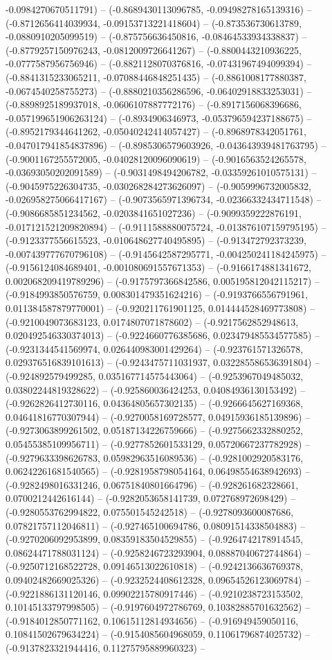 -0.0984270670511791) -- (-0.8689430113096785, -0.09498278165139316) -- (-0.8712656414039934, -0.09153713221418604) -- (-0.873536730613789, -0.0880910205099519) -- (-0.875756636450816, -0.08464533934338837) -- (-0.8779257150976243, -0.0812009726641267) -- (-0.8800443210936225, -0.0777587956756946) -- (-0.8821128070376816, -0.07431967494099394) -- (-0.8841315233065211, -0.07088446848251435) -- (-0.8861008177880387, -0.0674540258755273) -- (-0.8880210356286596, -0.06402918833253031) -- (-0.8898925189937018, -0.0606107887772176) -- (-0.8917156068396686, -0.057199651906263124) -- (-0.8934906346973, -0.053796594237188675) -- (-0.8952179344641262, -0.05040242414057427) -- (-0.8968978342051761, -0.047017941854837896) -- (-0.8985306579603926, -0.043643939481763795) -- (-0.9001167255572005, -0.04028120096090619) -- (-0.9016563524265578, -0.03693050202091589) -- (-0.9031498494206782, -0.03359261010575131) -- (-0.9045975226304735, -0.030268284273626097) -- (-0.9059996732005832, -0.026958275066417167) -- (-0.9073565971396734, -0.02366332434711548) -- (-0.9086685851234562, -0.0203841651027236) -- (-0.9099359222876191, -0.017121521209820894) -- (-0.9111588880075724, -0.013876107159795195) -- (-0.9123377556615523, -0.010648627740495895) -- (-0.913472792373239, -0.007439777670796108) -- (-0.9145642587295771, -0.004250241184245975) -- (-0.9156124084689401, -0.001080691557671353) -- (-0.9166174881341672, 0.002068209419789296) -- (-0.9175797366842586, 0.005195812042115217) -- (-0.9184993850576759, 0.008301479351624216) -- (-0.9193766556791961, 0.011384587879770001) -- (-0.920211761901125, 0.014444528469773808) -- (-0.9210049073683123, 0.0174807071878602) -- (-0.9217562852948613, 0.020492546330374013) -- (-0.9224660776385686, 0.023479485534577585) -- (-0.9231344541569974, 0.026440983001429264) -- (-0.923761571326578, 0.029376516839101613) -- (-0.9243475711031937, 0.032285586536391804) -- (-0.924892579499285, 0.035167714575443064) -- (-0.9253967049485032, 0.03802244819328622) -- (-0.925860036424253, 0.04084936130153492) -- (-0.9262826412730116, 0.04364805657302135) -- (-0.9266645627169368, 0.04641816770307944) -- (-0.9270058169728577, 0.04915936185139896) -- (-0.9273063899261502, 0.05187134226759666) -- (-0.9275662332880252, 0.05455385109956711) -- (-0.9277852601533129, 0.05720667237782928) -- (-0.9279633398626783, 0.05982963516089536) -- (-0.9281002920583176, 0.06242261681540565) -- (-0.9281958798054164, 0.06498554638942693) -- (-0.9282498016331246, 0.06751840801664796) -- (-0.928261682328661, 0.0700212442616144) -- (-0.9282053658141739, 0.072768972698429) -- (-0.9280553762994822, 0.075501545242518) -- (-0.9278093600087686, 0.07821757112046811) -- (-0.927465100694786, 0.08091514338504883) -- (-0.9270206092953899, 0.08359183504529855) -- (-0.9264742178914545, 0.08624471788031124) -- (-0.9258246723293904, 0.08887040672744864) -- (-0.9250712168522728, 0.09146513022610818) -- (-0.9242136636769378, 0.09402482669025326) -- (-0.9232524408612328, 0.09654526123069784) -- (-0.9221886131120146, 0.09902215780917446) -- (-0.9210238723153502, 0.10145133797998505) -- (-0.9197604972786769, 0.10382885701632562) -- (-0.9184012850771162, 0.10615112814934656) -- (-0.916949459050116, 0.10841502679634224) -- (-0.9154085604968059, 0.11061796874025732) -- (-0.9137823321944416, 0.11275795889960323) -- 